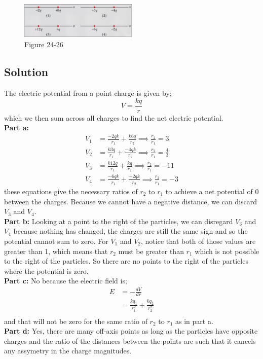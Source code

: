 \documentclass{article}
\begin{document}
\begin{figure}[h]
	\centering
	\includegraphics[width=0.5\textwidth]{image-2.png}
	\caption{Figure 24-26}
\end{figure}

\subsection*{Solution}
The electric potential from a point charge is given by;
\begin{equation}
    V = \frac{kq}{r}
\end{equation}
which we then sum across all charges to find the net electric potential.\\
\textbf{Part a:}
\begin{align*}
	V_1 &= \frac{-2qk}{r_1} + \frac{k6q}{r_2} \implies \frac{r_2}{r_1} = 3\\
	V_2 &= \frac{k3q}{r_1} + \frac{-4qk}{r_2} \implies \frac{r_2}{r_1} = \frac{4}{3}\\
	V_3 &= \frac{k12q}{r_1} + \frac{kq}{r_2} \implies \frac{r_2}{r_1} = -11\\
	V_4 &= \frac{-6qk}{r_1} + \frac{-2qk}{r_2} \implies \frac{r_2}{r_1} = -3
\end{align*}
these equations give the necessary ratios of $r_2$ to $r_1$ to achieve a net potential of 0 between the charges. Because we cannot have a negative distance, we can discard $V_3$ and $V_4$.\\[10pt]
\textbf{Part b:}
Looking at a point to the right of the particles, we can disregard $V_3$ and $V_4$ because nothing has changed, the charges are still the same sign and so the potential cannot sum to zero. For $V_1$ and $V_2$, notice that both of those values are greater than 1, which means that $r_2$ must be greater than $r_1$ which is not possible to the right of the particles. So there are no points to the right of the particles where the potential is zero.\\[10pt]
\textbf{Part c:}
No because the electric field is;
\begin{align*}
	E &= -\frac{dV}{dr} \\
	&= \frac{kq_1}{r_1^2} + \frac{kq_2}{r_2^2} \\
\end{align*}
and that will not be zero for the same ratio of $r_2$ to $r_1$ as in part a.\\[10pt]
\textbf{Part d:}
Yes, there are many off-axis points as long as the particles have opposite charges and the ratio of the distances between the points are such that it cancels any assymetry in the charge magnitudes.
\end{document}
